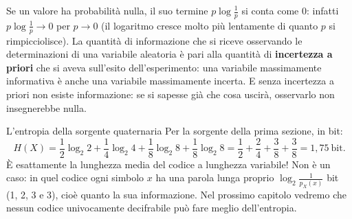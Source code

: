 
Se un valore ha probabilità nulla, il suo termine $p \log \frac1p$ si conta come 0: infatti $p \log \frac1p \to 0$ per
$p \to 0$ (il logaritmo cresce molto più lentamente di quanto $p$ si rimpicciolisce). La quantità di informazione che
si riceve osservando le determinazioni di una variabile aleatoria è pari alla quantità di \textbf{incertezza a priori}
che si aveva sull'esito dell'esperimento: una variabile massimamente informativa è anche una variabile massimamente
incerta. E senza incertezza a priori non esiste informazione: se si sapesse già che cosa uscirà, osservarlo non
insegnerebbe nulla.

\begin{esempio}{L'entropia della sorgente quaternaria}
Per la sorgente della prima sezione, in bit:
\[ H(X) = \frac12 \log_2 2 + \frac14 \log_2 4 + \frac18 \log_2 8 + \frac18 \log_2 8 = \frac12 + \frac24 + \frac38 +
   \frac38 = 1{,}75 \ \text{bit} . \]
È esattamente la lunghezza media del codice a lunghezza variabile! Non è un caso: in quel codice ogni simbolo $x$ ha
una parola lunga proprio $\log_2 \frac{1}{p_X(x)}$ bit (1, 2, 3 e 3), cioè quanto la sua informazione. Nel prossimo
capitolo vedremo che nessun codice univocamente decifrabile può fare meglio dell'entropia.
\end{esempio}

